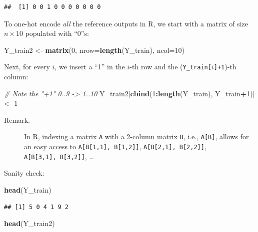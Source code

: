 \documentclass[10pt,b5paper,krantz1]{krantz}
\newenvironment{Shaded}{\begin{snugshade}}{\end{snugshade}}
\newcommand{\CommentTok}[1]{\textcolor[rgb]{0.37,0.37,0.37}{\textit{#1}}}
\newcommand{\DataTypeTok}[1]{\textcolor[rgb]{0.27,0.27,0.27}{#1}}
\newcommand{\DecValTok}[1]{\textcolor[rgb]{0.06,0.06,0.06}{#1}}
\newcommand{\KeywordTok}[1]{\textcolor[rgb]{0.27,0.27,0.27}{\textbf{#1}}}
\newcommand{\NormalTok}[1]{#1}
\newcommand{\OperatorTok}[1]{\textcolor[rgb]{0.43,0.43,0.43}{\textbf{#1}}}
\newcommand{\StringTok}[1]{\textcolor[rgb]{0.5,0.5,0.5}{#1}}
\begin{document}
\begin{verbatim}
##  [1] 0 0 1 0 0 0 0 0 0 0
\end{verbatim}

To one-hot encode \emph{all} the reference outputs in R,
we start with a matrix of size \(n\times 10\) populated with ``0''s:

\begin{Shaded}
\begin{Highlighting}[]
\NormalTok{Y_train2 <-}\StringTok{ }\KeywordTok{matrix}\NormalTok{(}\DecValTok{0}\NormalTok{, }\DataTypeTok{nrow=}\KeywordTok{length}\NormalTok{(Y_train), }\DataTypeTok{ncol=}\DecValTok{10}\NormalTok{)}
\end{Highlighting}
\end{Shaded}

Next, for every \(i\), we insert a ``1'' in the \(i\)-th row
and the (\texttt{Y\_train{[}}\(i\)\texttt{{]}+1})-th column:

\begin{Shaded}
\begin{Highlighting}[]
\CommentTok{# Note the "+1" 0..9 -> 1..10}
\NormalTok{Y_train2[}\KeywordTok{cbind}\NormalTok{(}\DecValTok{1}\OperatorTok{:}\KeywordTok{length}\NormalTok{(Y_train), Y_train}\OperatorTok{+}\DecValTok{1}\NormalTok{)] <-}\StringTok{ }\DecValTok{1}
\end{Highlighting}
\end{Shaded}

\begin{description}
\item[Remark.]
In R, indexing a matrix \texttt{A} with a 2-column matrix \texttt{B}, i.e., \texttt{A{[}B{]}},
allows for an easy access to
\texttt{A{[}B{[}1,1{]},\ B{[}1,2{]}{]}}, \texttt{A{[}B{[}2,1{]},\ B{[}2,2{]}{]}}, \texttt{A{[}B{[}3,1{]},\ B{[}3,2{]}{]}}, \ldots{}
\end{description}

Sanity check:

\begin{Shaded}
\begin{Highlighting}[]
\KeywordTok{head}\NormalTok{(Y_train)}
\end{Highlighting}
\end{Shaded}

\begin{verbatim}
## [1] 5 0 4 1 9 2
\end{verbatim}

\begin{Shaded}
\begin{Highlighting}[]
\KeywordTok{head}\NormalTok{(Y_train2)}
\end{Highlighting}
\end{Shaded}
\end{document}
